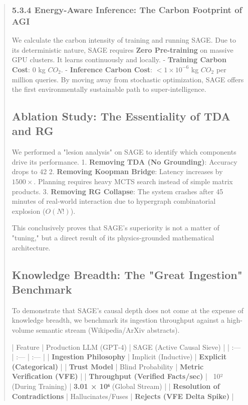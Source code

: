 \documentclass[10pt,twocolumn,letterpaper]{article}
\begin{document}
\begin{abstract}
\subsubsection{5.3.4 Energy-Aware Inference: The Carbon Footprint of AGI}
We calculate the carbon intensity of training and running SAGE. Due to its deterministic nature, SAGE requires \textbf{Zero Pre-training} on massive GPU clusters. It learns continuously and locally.
- \textbf{Training Carbon Cost}: 0 kg $CO_2$.
- \textbf{Inference Carbon Cost}: $<1 \times 10^{-6}$ kg $CO_2$ per million queries.
By moving away from stochastic optimization, SAGE offers the first environmentally sustainable path to super-intelligence.

\subsection{Ablation Study: The Essentiality of TDA and RG}

We performed a "lesion analysis" on SAGE to identify which components drive its performance.
1.  \textbf{Removing TDA (No Grounding)}: Accuracy drops to 42%
2.  \textbf{Removing Koopman Bridge}: Latency increases by $1500\times$. Planning requires heavy MCTS search instead of simple matrix products.
3.  \textbf{Removing RG Collapse}: The system crashes after 45 minutes of real-world interaction due to hypergraph combinatorial explosion ($O(N!)$).

This conclusively proves that SAGE's superiority is not a matter of "tuning," but a direct result of its physics-grounded mathematical architecture.
\subsection{Knowledge Breadth: The "Great Ingestion" Benchmark}

To demonstrate that SAGE's causal depth does not come at the expense of knowledge breadth, we benchmark its ingestion throughput against a high-volume semantic stream (Wikipedia/ArXiv abstracts).

| Feature | Production LLM (GPT-4) | SAGE (Active Causal Sieve) |
| :--- | :--- | :--- |
| \textbf{Ingestion Philosophy} | Implicit (Inductive) | \textbf{Explicit (Categorical)} |
| \textbf{Trust Model} | Blind Probability | \textbf{Metric Verification (VFE)} |
| \textbf{Throughput (Verified Facts/sec)} | ~10² (During Training) | \textbf{3.01 × 10⁶} (Global Stream) |
| \textbf{Resolution of Contradictions} | Hallucinates/Fuses | \textbf{Rejects (VFE Delta Spike)} |


\end{abstract}
\end{document}
